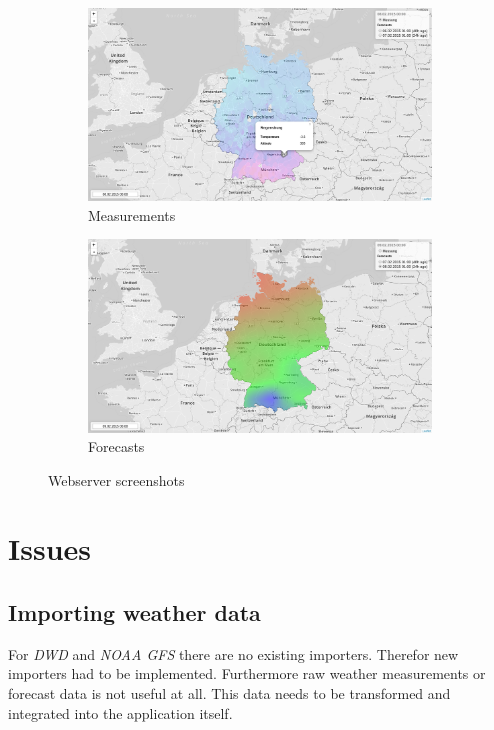 \documentclass{scrartcl}
\begin{document}
\begin{figure}[h!]
\centering
\begin{subfigure}{.5\textwidth}
  \centering
  \includegraphics[width=.9\linewidth]{../presentation/images/live_measurement.png}
  \caption{Measurements}
\end{subfigure}%
\begin{subfigure}{.5\textwidth}
  \centering
  \includegraphics[width=.9\linewidth]{../presentation/images/live_forecast.png}
  \caption{Forecasts}
\end{subfigure}
\caption{Webserver screenshots}
\end{figure}

\section{Issues}
\subsection{Importing weather data}
For \textit{DWD} and \textit{NOAA GFS} there are no existing importers. Therefor
new importers had to be implemented. Furthermore raw weather measurements or
forecast data is not useful at all. This data needs to be transformed and
integrated into the application itself.
\end{document}
